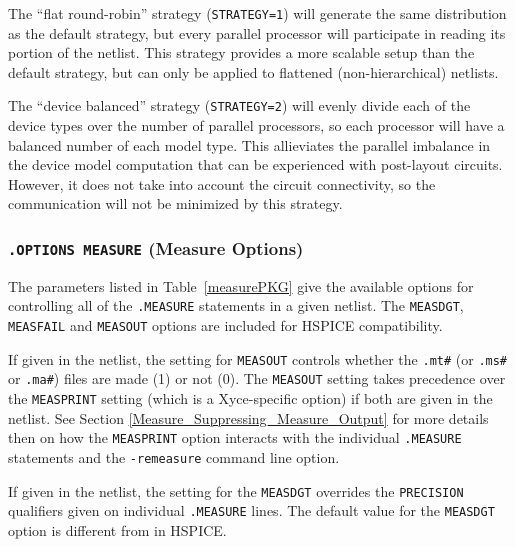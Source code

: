 The ``flat round-robin'' strategy (\texttt{STRATEGY=1}) will generate
the same distribution as the default strategy, but every parallel
processor will participate in reading its portion of the netlist.
This strategy provides a more scalable setup than the default
strategy, but can only be applied to flattened (non-hierarchical)
netlists.

The ``device balanced'' strategy (\texttt{STRATEGY=2}) will evenly
divide each of the device types over the number of parallel
processors, so each processor will have a balanced number of each
model type.  This allieviates the parallel imbalance in the device
model computation that can be experienced with post-layout circuits.
However, it does not take into account the circuit connectivity, so
the communication will not be minimized by this strategy.



\subsubsection{\texttt{.OPTIONS MEASURE} (Measure Options)}
The parameters listed in Table~\ref{measurePKG} give the available
options for controlling all of the \texttt{.MEASURE} statements in
a given \Xyce{} netlist.  The \texttt{MEASDGT}, \texttt{MEASFAIL}
and \texttt{MEASOUT} options are included for HSPICE compatibility.

If given in the netlist, the setting for \texttt{MEASOUT} controls whether 
the \texttt{.mt\#} (or \texttt{.ms\#} or \texttt{.ma\#}) files are made (1) or not (0). 
The \texttt{MEASOUT} setting takes precedence over the \texttt{MEASPRINT} setting 
(which is a Xyce-specific option) if both are given in the netlist.
See Section \ref{Measure_Suppressing_Measure_Output} for more details then on 
how the \texttt{MEASPRINT} option interacts with the individual 
\texttt {.MEASURE} statements and the \texttt{-remeasure} command 
line option.

If given in the netlist, the setting for the \texttt{MEASDGT} overrides the 
\texttt{PRECISION} qualifiers given on individual \texttt{.MEASURE} lines. 
The default value for the \texttt{MEASDGT} option is different from in HSPICE.


